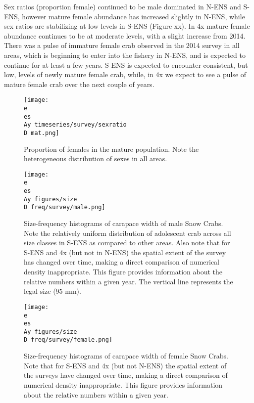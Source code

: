 \documentclass[paper=a4, fontsize=11pt]{article}
\newcommand{\D}{.}
\newcommand{\e}{/home/michelle/ecomod_data/}
\newcommand{\es}{snowcrab/}
\newcommand{\Ay}{assessments/2015/}
\begin{document}
Sex ratios (proportion female) continued to be male dominated in N-ENS and S-ENS, however mature female abundance has increased slightly in N-ENS, while sex ratios are stabilizing at low levels in S-ENS (Figure xx). In 4x mature female abundance continues to be at moderate levels, with a slight increase from 2014. There was a pulse of immature female crab observed in the 2014 survey in all areas, which is beginning to enter into the fishery in N-ENS, and is expected to continue for at least a few years. S-ENS is expected to encounter consistent, but low, levels of newly mature female crab, while, in 4x we expect to see a pulse of mature female crab over the next couple of years.
\clearpage

\begin{figure}[h]
  \centering
  \texttt{[image: \\e \\es \\Ay timeseries/survey/sexratio\\D mat.png]}
  \caption{Proportion of females in the mature population. Note the heterogeneous distribution of sexes in all areas.}
\end{figure}
\clearpage


\begin{figure}[h]
    \centering
    \texttt{[image: \\e \\es \\Ay figures/size\\D freq/survey/male.png]}
    \caption{Size-frequency histograms of carapace width of male Snow Crabs. Note the relatively uniform distribution of adolescent crab across all size classes in S-ENS as compared to other areas. Also note that for S-ENS and 4x (but not in N-ENS) the spatial extent of the survey has changed over time, making a direct comparison of numerical density inappropriate. This figure provides information about the relative numbers within a given year. The vertical line represents the legal size (95 mm).}
\end{figure}


\begin{figure}[h]
    \centering
    \texttt{[image: \\e \\es \\Ay figures/size\\D freq/survey/female.png]}
    \caption{Size-frequency histograms of carapace width of female Snow Crabs. Note that for S-ENS and 4x (but not N-ENS) the spatial extent of the surveys have changed over time, making a direct comparison of numerical density inappropriate. This figure provides information about the relative numbers within a given year.}
\end{figure}
\clearpage
\end{document}
